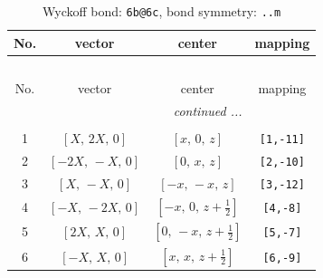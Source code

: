 \documentclass[fleqn,8pt]{jsarticle}
\begin{document}
\begin{longtable}{cccc}
\caption{Wyckoff bond: {\tt 6b@6c}, bond symmetry: {\tt ..m}}
 \\
 \hline \hline
No. & vector & center & mapping \\ \hline \endfirsthead

\multicolumn{3}{l}{\tablename\ \thetable{}} \\
 \hline \hline
No. & vector & center & mapping \\ \hline \endhead

 \hline \hline
\multicolumn{3}{r}{\footnotesize\it continued ...} \\ \endfoot

 \hline \hline
\multicolumn{3}{r}{} \\ \endlastfoot

1 & $\left[ X,\, 2 X,\, 0 \right]$ & $\left[ x,\, 0,\, z \right]$ & {\tt [1,-11]} \\ \hline
2 & $\left[ - 2 X,\, - X,\, 0 \right]$ & $\left[ 0,\, x,\, z \right]$ & {\tt [2,-10]} \\ \hline
3 & $\left[ X,\, - X,\, 0 \right]$ & $\left[ - x,\, - x,\, z \right]$ & {\tt [3,-12]} \\ \hline
4 & $\left[ - X,\, - 2 X,\, 0 \right]$ & $\left[ - x,\, 0,\, z + \frac{1}{2} \right]$ & {\tt [4,-8]} \\ \hline
5 & $\left[ 2 X,\, X,\, 0 \right]$ & $\left[ 0,\, - x,\, z + \frac{1}{2} \right]$ & {\tt [5,-7]} \\ \hline
6 & $\left[ - X,\, X,\, 0 \right]$ & $\left[ x,\, x,\, z + \frac{1}{2} \right]$ & {\tt [6,-9]} \\
\end{longtable}
\renewcommand{\arraystretch}{1.2}
\end{document}
